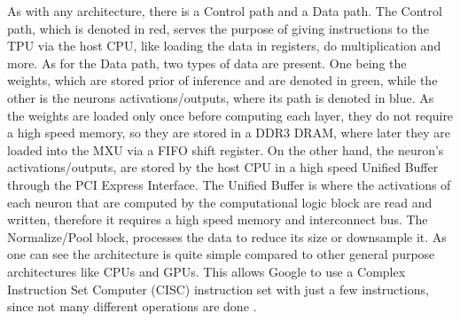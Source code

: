 As with any architecture, there is a Control path and a Data path. The Control path, which is denoted in red, serves the purpose of giving instructions to the TPU via the host CPU, like loading the data in registers, do multiplication and more. As for the Data path, two types of data are present. One being the weights, which are stored prior of inference and are denoted in green, while the other is the neurons activations/outputs, where its path is denoted in blue. As the weights are loaded only once before computing each layer, they do not require a high speed memory, so they are stored in a DDR3 DRAM, where later they are loaded into the MXU via a FIFO shift register. On the other hand, the neuron's activations/outputs, are stored by the host CPU in a high speed Unified Buffer through the PCI Express Interface. The Unified Buffer is where the activations of each neuron that are computed by the computational logic block are read and written, therefore it requires a high speed memory and interconnect bus. The Normalize/Pool block, processes the data to reduce its size or downsample it. As one can see the architecture is quite simple compared to other general purpose architectures like CPUs and GPUs. This allows Google to use a Complex Instruction Set Computer (CISC) instruction set with just a few instructions, since not many different operations are done \citep{sato}.

